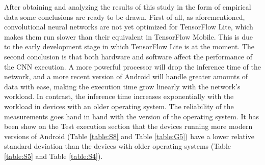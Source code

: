 After obtaining and analyzing the results of this study in the form of empirical data some conclusions are ready to be drawn. First of all, as aforementioned, convolutional neural networks are not yet optimized for TensorFlow Lite, which makes them run slower than their equivalent in TensorFlow Mobile. This is due to the early development stage in which TensorFlow Lite is at the moment. The second conclusion is that both hardware and software affect the performance of the CNN execution. A more powerful processor will drop the inference time of the network, and a more recent version of Android will handle greater amounts of data with ease, making the execution time grow linearly with the network's workload. In contrast, the inference time increases exponentially with the workload in devices with an older operating system. The reliability of the measurements goes hand in hand with the version of the operating system. It has been show on the Test execution section that the devices running more modern versions of Android (Table \ref{table:S8} and Table \ref{table:G5}) have a lower relative standard deviation than the devices with older operating systems (Table \ref{table:S5} and Table \ref{table:S4}). \\


